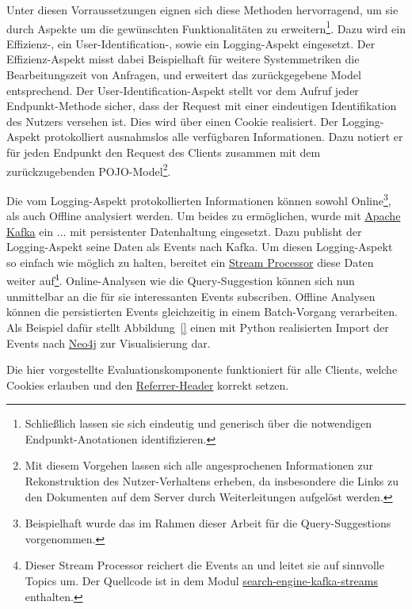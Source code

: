 Unter diesen Vorraussetzungen eignen sich diese Methoden hervorragend,
um sie durch Aspekte um die gewünschten Funktionalitäten zu erweitern\footnote{Schließlich lassen
sie sich eindeutig und generisch über die notwendigen Endpunkt-Anotationen
identifizieren.}.
Dazu wird ein Effizienz-, ein User-Identification-, sowie ein Logging-Aspekt eingesetzt.
Der Effizienz-Aspekt misst dabei Beispielhaft für weitere Systemmetriken die Bearbeitungszeit von Anfragen,
und erweitert das zurückgegebene Model entsprechend.
Der User-Identification-Aspekt stellt
vor dem Aufruf jeder Endpunkt-Methode sicher, dass der Request mit einer
eindeutigen Identifikation des Nutzers versehen ist.
Dies wird über einen Cookie realisiert.
Der Logging-Aspekt protokolliert ausnahmslos alle verfügbaren Informationen.
Dazu notiert er für jeden Endpunkt den Request des Clients zusammen mit dem zurückzugebenden
POJO-Model\footnote{Mit diesem Vorgehen lassen sich alle angesprochenen Informationen zur Rekonstruktion des Nutzer-Verhaltens erheben,
da insbesondere die Links zu den Dokumenten auf dem Server durch Weiterleitungen aufgelöst werden.}.

Die vom Logging-Aspekt protokollierten Informationen können sowohl
Online\footnote{Beispielhaft wurde das im Rahmen dieser Arbeit für die Query-Suggestions vorgenommen.},
als auch Offline analysiert werden.
Um beides zu ermöglichen, wurde mit \href{https://kafka.apache.org/}{Apache Kafka}
ein ... mit persistenter Datenhaltung eingesetzt.
Dazu publisht der Logging-Aspekt seine Daten als Events nach Kafka.
Um diesen Logging-Aspekt so einfach wie möglich zu halten, bereitet ein
\href{https://www.confluent.io/blog/introducing-kafka-streams-stream-processing-made-simple/}{Stream Processor}
diese Daten weiter auf\footnote{Dieser Stream Processor reichert die Events an und leitet sie
auf sinnvolle Topics um. Der Quellcode ist in dem Modul 
\href{https://github.com/mam10eks/search-homepage-of-university-leipzig/tree/master/search-engine-kafka-streams}
{search-engine-kafka-streams} enthalten.}.
Online-Analysen wie die Query-Suggestion können sich nun unmittelbar an die für sie interessanten Events subscriben.
Offline Analysen können die persistierten Events gleichzeitig in einem  Batch-Vorgang verarbeiten.
Als Beispiel dafür stellt Abbildung~\ref{} einen mit Python realisierten
Import der Events nach \href{https://de.wikipedia.org/wiki/Neo4j}{Neo4j} zur Visualisierung dar.

Die hier vorgestellte Evaluationskomponente funktioniert für alle Clients, welche Cookies erlauben und den \href{}{Referrer-Header}
korrekt setzen.
